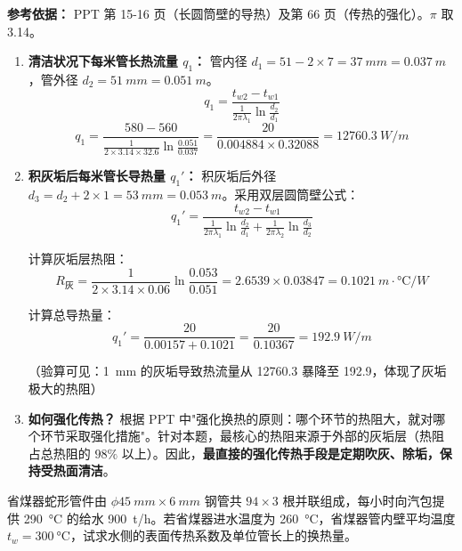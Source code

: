 \begin{solution}
\textbf{参考依据：} PPT 第 15-16 页（长圆筒壁的导热）及第 66 页（传热的强化）。\(\pi\) 取 3.14。

\begin{enumerate}
  \item \textbf{清洁状况下每米管长热流量 \(q_1\)：} 管内径 \(d_1 = 51 - 2 \times 7 = \qty{37}{mm} = \qty{0.037}{m}\)，管外径 \(d_2 = \qty{51}{mm} = \qty{0.051}{m}\)。
  \begin{equation*}
    q_1 = \frac{t_{w2} - t_{w1}}{\frac{1}{2\pi\lambda_1}\ln\frac{d_2}{d_1}}
  \end{equation*}
  \begin{equation*}
    q_1 = \frac{580 - 560}{\frac{1}{2 \times 3.14 \times 32.6}\ln\frac{0.051}{0.037}} = \frac{20}{0.004884 \times 0.32088} = \qty{12760.3}{W/m}
  \end{equation*}

  \item \textbf{积灰垢后每米管长导热量 \(q_1'\)：} 积灰垢后外径 \(d_3 = d_2 + 2 \times 1 = \qty{53}{mm} = \qty{0.053}{m}\)。采用双层圆筒壁公式：
  \begin{equation*}
    q_1' = \frac{t_{w2} - t_{w1}}{\frac{1}{2\pi\lambda_1}\ln\frac{d_2}{d_1} + \frac{1}{2\pi\lambda_2}\ln\frac{d_3}{d_2}}
  \end{equation*}

  计算灰垢层热阻：
  \begin{equation*}
    R_{\text{灰}} = \frac{1}{2 \times 3.14 \times 0.06}\ln\frac{0.053}{0.051} = 2.6539 \times 0.03847 = \qty{0.1021}{m\cdot\degreeCelsius/W}
  \end{equation*}

  计算总导热量：
  \begin{equation*}
    q_1' = \frac{20}{0.00157 + 0.1021} = \frac{20}{0.10367} = \qty{192.9}{W/m}
  \end{equation*}

  （验算可见：\qty{1}{mm} 的灰垢导致热流量从 12760.3 暴降至 192.9，体现了灰垢极大的热阻）

  \item \textbf{如何强化传热？} 根据 PPT 中"强化换热的原则：哪个环节的热阻大，就对哪个环节采取强化措施"。针对本题，最核心的热阻来源于外部的灰垢层（热阻占总热阻的 \(98\%\) 以上）。因此，\textbf{最直接的强化传热手段是定期吹灰、除垢，保持受热面清洁}。
\end{enumerate}
\end{solution}

\begin{problem}[省煤器管内强制对流换热计算]
省煤器蛇形管件由 \(\phi \qty{45}{mm} \times \qty{6}{mm}\) 钢管共 \(94 \times 3\) 根并联组成，每小时向汽包提供 \qty{290}{\degreeCelsius} 的给水 \qty{900}{t/h}。若省煤器进水温度为 \qty{260}{\degreeCelsius}，省煤器管内壁平均温度 \(t_w = \qty{300}{\degreeCelsius}\)，试求水侧的表面传热系数及单位管长上的换热量。
\end{problem}

